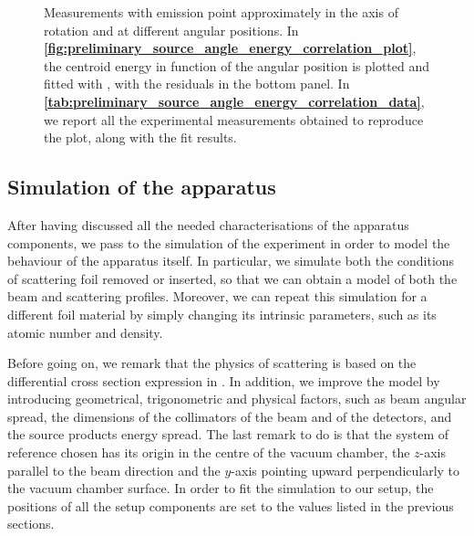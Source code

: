 \documentclass[../../main/main.tex]{subfiles}
\begin{document}
\begin{figure}[h]
\begin{minipage}[c]{0.49\linewidth}
{            \label{tab:preliminary_source_angle_energy_correlation_data}
        }
    \end{minipage}
    \caption{Measurements with emission point approximately in the axis of rotation and at different angular positions. In \textbf{\ref{fig:preliminary_source_angle_energy_correlation_plot}}, the centroid energy in function of the angular position is plotted and fitted with , with the residuals in the bottom panel. In \textbf{\ref{tab:preliminary_source_angle_energy_correlation_data}}, we report all the experimental measurements obtained to reproduce the plot, along with the fit results.}
    \label{fig:preliminary_source_angle_energy_correlation}
\end{figure}



















\subsection{Simulation of the apparatus}

After having discussed all the needed characterisations of the apparatus components, we pass to the simulation of the experiment in order to model the behaviour of the apparatus itself. In particular, we simulate both the conditions of scattering foil removed or inserted, so that we can obtain a model of both the beam and scattering profiles. Moreover, we can repeat this simulation for a different foil material by simply changing its intrinsic parameters, such as its atomic number and density.

Before going on, we remark that the physics of scattering is based on the differential cross section expression in . In addition, we improve the model by introducing geometrical, trigonometric and physical factors, such as beam angular spread, the dimensions of the collimators of the beam and of the detectors, and the source products energy spread. The last remark to do is that the  system of reference chosen has its origin in the centre of the vacuum chamber, the \( z \)-axis parallel to the beam direction and the \( y \)-axis pointing upward perpendicularly to the vacuum chamber surface. In order to fit the simulation to our setup, the positions of all the setup components are set to the values listed in the previous sections.
\end{document}
